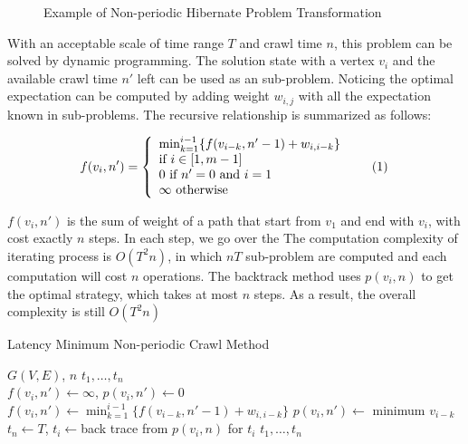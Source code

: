 \documentclass[conference]{IEEEtran}
\newcommand\numberthis{\addtocounter{equation}{1}\tag{\theequation}}
\begin{document}
\begin{figure}
	\centering
	
	\captionsetup{justification=centering}
	\caption{Example of Non-periodic Hibernate Problem Transformation}
	\label{fig:problemtrans}
\end{figure}


With an acceptable scale of time range $T$ and crawl time $n$, this problem can be solved by dynamic programming. The solution state with a vertex $v_i$ and the available crawl time $n'$ left can be used as an sub-problem. Noticing the optimal expectation can be computed by adding weight $w_{i,j}$ with all the expectation known in sub-problems. The recursive relationship is summarized as follows:

\[f(v_i, n')=\left\{
\begin{array}{lr}
\min_{k=1}^{i-1}\{f(v_{i-k}, n'-1)+w_{i,i-k}\}\\
\text{if }i\in[1, m-1]\\
0\text{ if }n'=0\text{ and }i=1\\
\infty\text{ otherwise}
\end{array}\numberthis \label{dp}
\right.
\]


$f(v_i,n')$ is the sum of weight of a path that start from $v_1$ and end with $v_i$, with cost exactly $n$ steps. In each step, we go over the  The computation complexity of iterating process is $O(T^2n)$, in which $nT$ sub-problem are computed and each computation will cost $n$ operations. The backtrack method uses $p(v_i, n)$ to get the optimal strategy, which takes at most $n$ steps. As a result, the overall complexity is still $O(T^2n)$ 

\begin{algorithm}
	\caption{Latency Minimum Non-periodic Crawl Method}
	\label{alg:dp_min}
	\begin{algorithmic}[1]
		\renewcommand{\algorithmicrequire}{\textbf{Input:}}
		\renewcommand{\algorithmicensure}{\textbf{Output:}}
		\REQUIRE $G(V,E)$, $n$
		\ENSURE  $t_1,\ldots,t_n$
		\\
		\STATE $f(v_i,n') \gets \infty$, $p(v_i,n')\gets 0$
		\STATE $f(v_i,n')\gets\min_{k=1}^{i-1}\{f(v_{i-k}, n'-1)+w_{i,i-k}\}$
		\STATE $p(v_i,n')\gets$ minimum $v_{i-k}$
		\ENDFOR
		\ENDFOR
		\STATE $t_n\gets T$, $t_i\gets$back trace from $p(v_i, n)$ for $t_i$
		\RETURN $t_1,\ldots,t_n$
	\end{algorithmic}
\end{algorithm}
\end{document}

